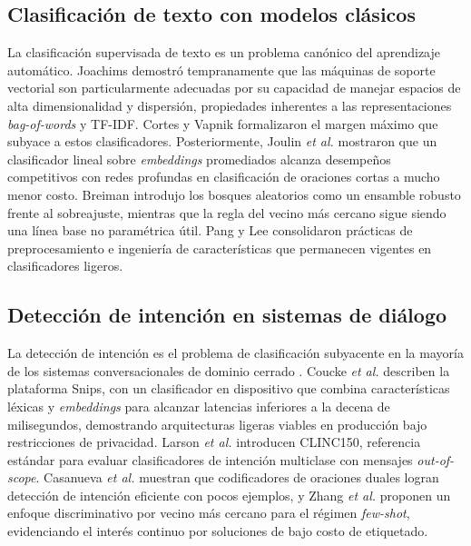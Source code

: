 \documentclass[journal]{IEEEtran}
\begin{document}
\subsection{Clasificaci\'on de texto con modelos cl\'asicos}
La clasificaci\'on supervisada de texto es un problema can\'onico del aprendizaje
autom\'atico. Joachims \cite{joachims1998svmtext} demostr\'o tempranamente que
las m\'aquinas de soporte vectorial son particularmente adecuadas por su
capacidad de manejar espacios de alta dimensionalidad y dispersi\'on, propiedades
inherentes a las representaciones \emph{bag-of-words} y TF-IDF. Cortes y Vapnik
\cite{cortes1995svm} formalizaron el margen m\'aximo que subyace a estos
clasificadores. Posteriormente, Joulin \emph{et al.} \cite{joulin2017fasttext}
mostraron que un clasificador lineal sobre \emph{embeddings} promediados alcanza
desempe\~nos competitivos con redes profundas en clasificaci\'on de oraciones
cortas a mucho menor costo. Breiman \cite{breiman2001randomforests} introdujo los
bosques aleatorios como un ensamble robusto frente al sobreajuste, mientras que
la regla del vecino m\'as cercano \cite{cover1967nearest} sigue siendo una
l\'inea base no param\'etrica \'util. Pang y Lee \cite{pang2008opinion}
consolidaron pr\'acticas de preprocesamiento e ingenier\'ia de caracter\'isticas
que permanecen vigentes en clasificadores ligeros.

\subsection{Detecci\'on de intenci\'on en sistemas de di\'alogo}
La detecci\'on de intenci\'on es el problema de clasificaci\'on subyacente en la
mayor\'ia de los sistemas conversacionales de dominio cerrado \cite{tur2011slu}.
Coucke \emph{et al.} \cite{coucke2018snips} describen la plataforma Snips, con un
clasificador en dispositivo que combina caracter\'isticas l\'exicas y
\emph{embeddings} para alcanzar latencias inferiores a la decena de
milisegundos, demostrando arquitecturas ligeras viables en producci\'on bajo
restricciones de privacidad. Larson \emph{et al.} \cite{larson2019clinc}
introducen CLINC150, referencia est\'andar para evaluar clasificadores de
intenci\'on multiclase con mensajes \emph{out-of-scope}. Casanueva \emph{et al.}
\cite{casanueva2020intent} muestran que codificadores de oraciones duales logran
detecci\'on de intenci\'on eficiente con pocos ejemplos, y Zhang \emph{et al.}
\cite{zhang2020dnnc} proponen un enfoque discriminativo por vecino m\'as cercano
para el r\'egimen \emph{few-shot}, evidenciando el inter\'es continuo por
soluciones de bajo costo de etiquetado.
\end{document}
